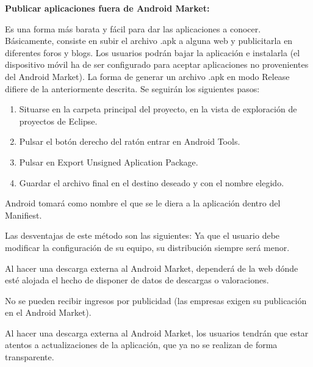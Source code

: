 \documentclass[12 pt, a4paper, twoside]{article}
\begin{document}
\textbf{Publicar aplicaciones fuera de Android Market:}

Es una forma más barata y fácil para dar las aplicaciones a conocer. Básicamente,
consiste en subir el archivo .apk a alguna web y publicitarla en diferentes
foros y blogs. Los usuarios podrán bajar la aplicación e instalarla (el dispositivo
móvil ha de ser configurado para aceptar aplicaciones no provenientes del Android
Market).
\clearpage
La forma de generar un archivo .apk en modo Release difiere de la anteriormente
descrita. Se seguirán los siguientes pasos:
\begin{enumerate}
\item Situarse en la carpeta principal del proyecto, en la vista de exploración de
proyectos de Eclipse.
\item Pulsar el botón derecho del ratón entrar en Android Tools.
\item Pulsar en Export Unsigned Aplication Package.
\item Guardar el archivo final en el destino deseado y con el nombre elegido.
\end{enumerate}

Android tomará como nombre el que se le diera a la aplicación dentro del
Manifiest.

Las desventajas de este método son las siguientes:
Ya que el usuario debe modificar la configuración de su equipo, su distribución
siempre será menor.

Al hacer una descarga externa al Android Market, dependerá de la web dónde
esté alojada el hecho de disponer de datos de descargas o valoraciones.

No se pueden recibir ingresos por publicidad (las empresas exigen su publicación
en el Android Market).

Al hacer una descarga externa al Android Market, los usuarios tendrán que
estar atentos a actualizaciones de la aplicación, que ya no se realizan de
forma transparente.


\end{document}
